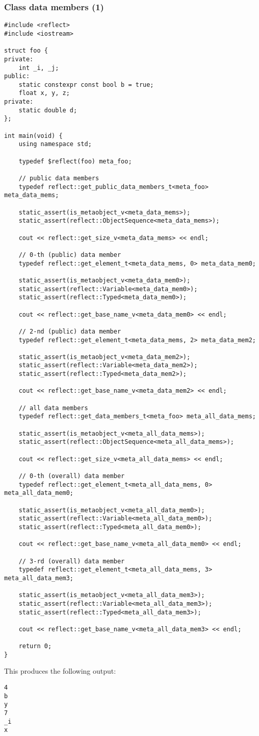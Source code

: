 \subsubsection{Class data members (1)}

\begin{verbatim}
#include <reflect>
#include <iostream>

struct foo {
private:
	int _i, _j;
public:
	static constexpr const bool b = true;
	float x, y, z;
private:
	static double d;
};

int main(void) {
	using namespace std;

	typedef $reflect(foo) meta_foo;

	// public data members
	typedef reflect::get_public_data_members_t<meta_foo> meta_data_mems;

	static_assert(is_metaobject_v<meta_data_mems>);
	static_assert(reflect::ObjectSequence<meta_data_mems>);

	cout << reflect::get_size_v<meta_data_mems> << endl;

	// 0-th (public) data member
	typedef reflect::get_element_t<meta_data_mems, 0> meta_data_mem0;

	static_assert(is_metaobject_v<meta_data_mem0>);
	static_assert(reflect::Variable<meta_data_mem0>);
	static_assert(reflect::Typed<meta_data_mem0>);

	cout << reflect::get_base_name_v<meta_data_mem0> << endl;

	// 2-nd (public) data member
	typedef reflect::get_element_t<meta_data_mems, 2> meta_data_mem2;

	static_assert(is_metaobject_v<meta_data_mem2>);
	static_assert(reflect::Variable<meta_data_mem2>);
	static_assert(reflect::Typed<meta_data_mem2>);

	cout << reflect::get_base_name_v<meta_data_mem2> << endl;

	// all data members
	typedef reflect::get_data_members_t<meta_foo> meta_all_data_mems;

	static_assert(is_metaobject_v<meta_all_data_mems>);
	static_assert(reflect::ObjectSequence<meta_all_data_mems>);

	cout << reflect::get_size_v<meta_all_data_mems> << endl;

	// 0-th (overall) data member
	typedef reflect::get_element_t<meta_all_data_mems, 0> meta_all_data_mem0;

	static_assert(is_metaobject_v<meta_all_data_mem0>);
	static_assert(reflect::Variable<meta_all_data_mem0>);
	static_assert(reflect::Typed<meta_all_data_mem0>);

	cout << reflect::get_base_name_v<meta_all_data_mem0> << endl;

	// 3-rd (overall) data member
	typedef reflect::get_element_t<meta_all_data_mems, 3> meta_all_data_mem3;

	static_assert(is_metaobject_v<meta_all_data_mem3>);
	static_assert(reflect::Variable<meta_all_data_mem3>);
	static_assert(reflect::Typed<meta_all_data_mem3>);

	cout << reflect::get_base_name_v<meta_all_data_mem3> << endl;

	return 0;
}

\end{verbatim}

This produces the following output:

\begin{verbatim}
4
b
y
7
_i
x
\end{verbatim}
